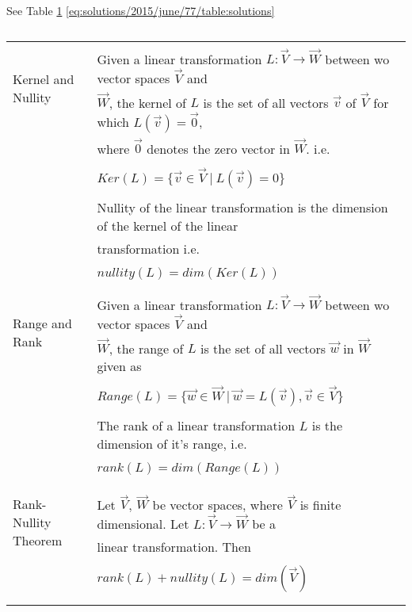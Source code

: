 See Table \ref{eq:solutions/2015/june/77/table:solutions0} \ref{eq:solutions/2015/june/77/table:solutions}

\onecolumn
	\begin{longtable}{|l|l|}
		\hline
		\multirow{3}{*}{Kernel and Nullity} 
		& \\
		& Given a linear transformation $L : \vec{V} \rightarrow \vec{W}$ between wo vector spaces $\vec{V}$ and \\ 
		& $\vec{W}$, the kernel of $L$ is the set of all vectors $\vec{v}$ of $\vec{V}$ for which $L(\vec{v}) = \vec{0}$, \\
		& where $\vec{0}$ denotes the zero vector in $\vec{W}$. i.e.\\
		& \\
		& \qquad \qquad \qquad $Ker(L) = \{\vec{v} \in \vec{V} \ |\ L(\vec{v}) = 0\}$ \\
		& \\
		& Nullity of the linear transformation is the dimension of the kernel of the linear \\
		& transformation i.e. \\
		& \\
		& \qquad \qquad \qquad $nullity(L) = dim(Ker(L))$ \\
		& \\
		\hline
		\multirow{3}{*}{Range and Rank} 
		& \\
		& Given a linear transformation $L : \vec{V} \rightarrow \vec{W}$ between wo vector spaces $\vec{V}$ and \\ 
		& $\vec{W}$, the range of $L$ is the set of all vectors $\vec{w}$ in $\vec{W}$ given as \\
		& \\
		& \qquad \qquad \qquad $Range(L) = \{\vec{w} \in \vec{W} \ |\ \vec{w} = L(\vec{v}), \vec{v} \in \vec{V}\}$ \\
		& \\
		& The rank of a linear transformation $L$ is the dimension of it's range, i.e. \\
		& \\
		& \qquad \qquad \qquad $rank(L) = dim(Range(L))$ \\
		& \\
		& \\
		\hline
		\multirow{3}{*}{Rank-Nullity Theorem} 
		& \\
		& Let $\vec{V}$, $\vec{W}$ be vector spaces, where $\vec{V}$ is finite dimensional. Let $L:\vec{V} \rightarrow \vec{W}$ be a \\
		& linear transformation. Then \\
		& \\
		&  \qquad \qquad  \qquad$rank(L) + nullity(L) = dim(\vec{V})$ \\
		& \\
		\hline
\caption{}
\label{eq:solutions/2015/june/77/table:solutions0}
	\end{longtable}
